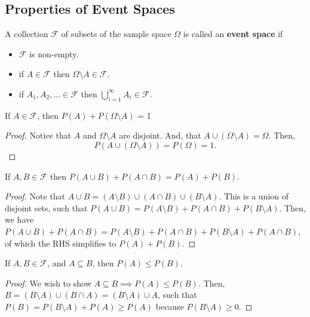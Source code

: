 
\subsection{Properties of Event Spaces}

\begin{definition}
	A collection \( \mathcal{F} \) of subsets of the sample space \( \Omega  \) is called an \textbf{event space} if 
	\begin{itemize}
		\item \( \mathcal{F} \) is non-empty.
		\item if \( A \in \mathcal{F} \) then \( \Omega \setminus A \in \mathcal{F} \).
		\item if \( A_{1},A_{2},\ldots \in \mathcal{F} \) then \( \bigcup_{i=1}^{\infty}A_i \in \mathcal{F} \).
	\end{itemize}
\end{definition}

\begin{theorem}
	If \( A \in \mathcal{F} \), then \( P(A) + P(\Omega \setminus A) \) = 1
\end{theorem}
\begin{proof}
	Notice that \( A \) and \( \Omega  \setminus  A \) are disjoint. And, that \( A \cup (\Omega  \setminus A) = \Omega \). Then,	\[
		P(A \cup (\Omega \setminus A)) = P(\Omega ) = 1
	.\] 
\end{proof}

\begin{theorem}
	If \( A,B \in \mathcal{F} \) then \( P(A \cup B) + P(A \cap B) = P(A) + P(B)\).
\end{theorem}
\begin{proof}
	Note that \( A \cup B = (A \setminus B) \cup (A \cap B) \cup (B \setminus A) \). This is a union of disjoint sets, such that \( P(A \cup B) = P(A \setminus B) + P(A \cap B) + P(B \setminus A) \). Then, we have \( P(A \cup B) + P(A \cap B) = P(A \setminus B) + P(A \cap B) + P(B \setminus A) + P(A \cap B)\), of which the RHS simplifies to \( P(A) + P(B) \).
\end{proof}

\begin{theorem}
	If \( A, B \in \mathcal{F} \), and \( A \subseteq B \), then \( P(A) \le  P(B) \).
\end{theorem}
\begin{proof}
	We wish to show \( A \subseteq B \implies P(A) \le P(B) \). Then, \( B = (B \setminus A) \cup  (B \cap A) = (B \setminus A) \cup  A \), such that \( P(B) = P(B \setminus A) + P(A) \ge P(A)\) because \( P(B \setminus A) \ge  0 \).
\end{proof}


